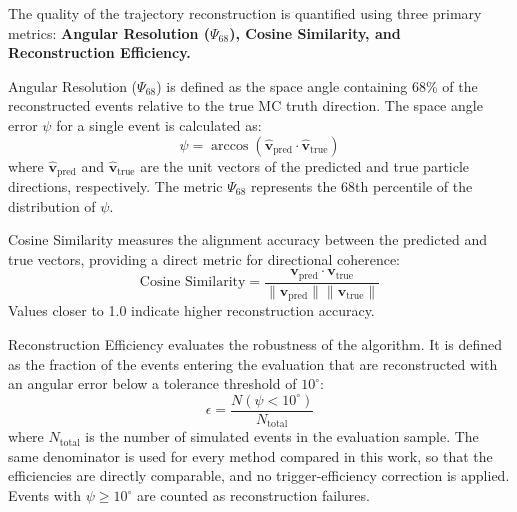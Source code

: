 \documentclass[preprint,12pt]{elsarticle}
\begin{document}
The quality of the trajectory reconstruction is quantified using three primary metrics: \textbf{Angular Resolution ($\Psi_{68}$), Cosine Similarity, and Reconstruction Efficiency.}

Angular Resolution ($\Psi_{68}$) is defined as the space angle containing 68\% of the reconstructed events relative to the true MC truth direction. The space angle error $\psi$ for a single event is calculated as:
\begin{equation}
\psi = \arccos(\hat{\mathbf{v}}_{\text{pred}} \cdot \hat{\mathbf{v}}_{\text{true}})
\end{equation}
where $\hat{\mathbf{v}}_{\text{pred}}$ and $\hat{\mathbf{v}}_{\text{true}}$ are the unit vectors of the predicted and true particle directions, respectively. The metric $\Psi_{68}$ represents the 68th percentile of the distribution of $\psi$.

Cosine Similarity measures the alignment accuracy between the predicted and true vectors, providing a direct metric for directional coherence:
\begin{equation}
\text{Cosine Similarity} = \frac{\mathbf{v}_{\text{pred}} \cdot \mathbf{v}_{\text{true}}}{\|\mathbf{v}_{\text{pred}}\| \|\mathbf{v}_{\text{true}}\|}
\end{equation}
Values closer to 1.0 indicate higher reconstruction accuracy.

Reconstruction Efficiency evaluates the robustness of the algorithm. It is defined as the fraction of the events entering the evaluation that are reconstructed with an angular error below a tolerance threshold of $10^{\circ}$:
\begin{equation}
\epsilon = \frac{N(\psi < 10^{\circ})}{N_{\text{total}}}
\end{equation}
where $N_{\text{total}}$ is the number of simulated events in the evaluation sample. The same denominator is used for every method compared in this work, so that the efficiencies are directly comparable, and no trigger-efficiency correction is applied. Events with $\psi \ge 10^{\circ}$ are counted as reconstruction failures.
\end{document}
